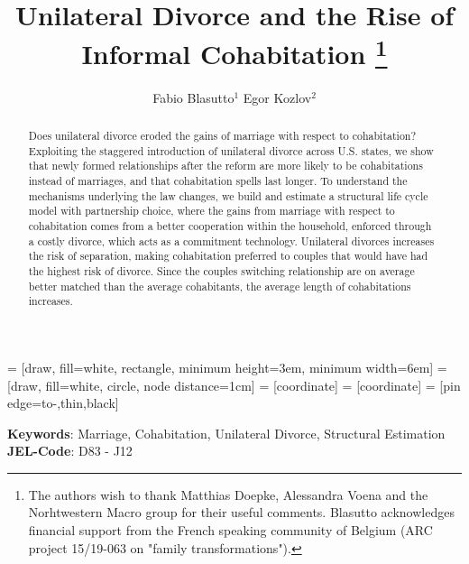 \documentclass[12pt]{article}
\title{Unilateral Divorce and the Rise of Informal Cohabitation	\thanks{The authors wish to thank Matthias Doepke, Alessandra Voena and the Norhtwestern Macro group for their useful comments. Blasutto acknowledges financial support from the French speaking community of Belgium (ARC project 15/19-063 on "family transformations").}}
\author{Fabio Blasutto$^1$ \quad Egor Kozlov$^2$}
\numberwithin{table}{section}
\begin{document}
	 	 = [draw, fill=white, rectangle, 
	minimum height=3em, minimum width=6em]
	 = [draw, fill=white, circle, node distance=1cm]
	 = [coordinate]
	 = [coordinate]
	 = [pin edge={to-,thin,black}]
	
	
	
	
	\maketitle

	
\begin{abstract}
	Does unilateral divorce eroded the gains of marriage with respect to cohabitation? Exploiting the staggered introduction of unilateral divorce across U.S. states, we show that newly formed relationships after the reform are more likely to be cohabitations instead of marriages, and that cohabitation spells last longer. To understand the mechanisms underlying the law changes, we build and estimate a structural life cycle model with partnership choice, where the gains from marriage with respect to cohabitation comes from a better cooperation within the household, enforced through a costly divorce, which acts as a commitment technology. Unilateral divorces increases the risk of separation, making cohabitation preferred to couples that would have had the highest risk of divorce. Since the couples switching relationship are on average better matched than the average cohabitants, the average length of cohabitations increases.
\end{abstract}
\textbf{Keywords}: Marriage, Cohabitation, Unilateral Divorce, Structural Estimation\\
\textbf{JEL-Code}: D83 - J12
\end{document}
